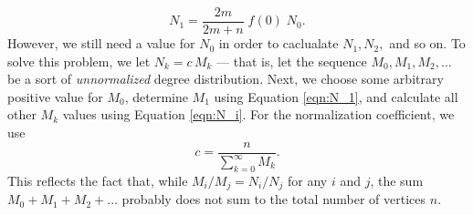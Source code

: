 \documentclass[a4paper,10pt]{article}
\begin{document}
\begin{equation}
\label{eqn:N_1}
 N_{1} = \frac{2m}{2m + n} \; f(0) \; N_0.
\end{equation}
However, we still need a value for $N_0$ in order to caclualate $N_1, N_2,$ and so on. To solve this problem, we let $N_k = c \, M_k$ --- that is, let the sequence $M_0, M_1, M_2, \ldots$ be a sort of \emph{unnormalized} degree distribution. Next, we choose some arbitrary positive value for $M_0$, determine $M_1$ using Equation \ref{eqn:N_1}, and calculate all other $M_k$ values using Equation \ref{eqn:N_i}. For the normalization coefficient, we use
\begin{equation}
 c = \frac{n}{\sum\limits_{k=0}^{\infty} M_k}.
\end{equation}
This reflects the fact that, while $M_i / M_j = N_i / N_j$ for any $i$ and $j$, the sum $M_0 + M_1 + M_2 + \ldots$ probably does not sum to the total number of vertices $n$.
\end{document}
